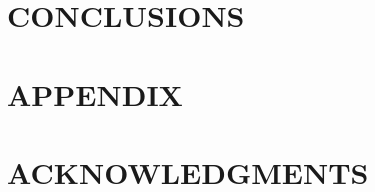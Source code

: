 \documentclass[12pt]{article}
\begin{document}
\begin{multicols}{2}
\blindtext\blindtext\blindtext



\begingroup\centering\section{CONCLUSIONS}\endgroup

\blindtext\blindtext\blindtext



\begingroup\centering\section{APPENDIX}\endgroup

\blindtext\blindtext\blindtext



\begingroup\centering\section{ACKNOWLEDGMENTS}\endgroup

\blindtext\blindtext\blindtext


\end{multicols}
\end{document}
